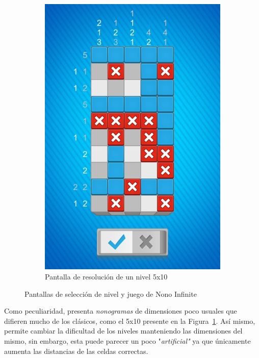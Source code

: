 \documentclass[11pt,spanish,listoffigures,listoftables]{tfgetsinf}
\begin{document}
\begin{figure}[h!]
\begin{subfigure}[b]{0.49\linewidth}
     \includegraphics[width=\linewidth]{images/infinite2.png}
     \caption{Pantalla de resolución de un nivel 5x10}
     \label{fig:infinite1-2}
   \end{subfigure}
   \caption{Pantallas de selección de nivel y juego de Nono Infinite}
   \label{fig:infinite1}
 \end{figure}

Como peculiaridad, presenta \textit{nonogramas} de dimensiones poco usuales que difieren mucho de los clásicos, como el 5x10 presente en la
Figura~\ref{fig:infinite1-2}. Así mismo, permite cambiar la dificultad de los niveles manteniendo las dimensiones del mismo, sin embargo,
esta puede parecer un poco "\textit{artificial"} ya que únicamente aumenta las distancias de las celdas correctas.
\end{document}
